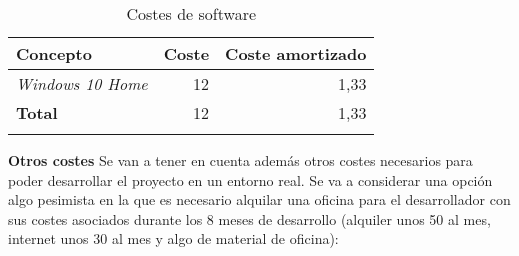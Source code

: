 \begin{longtable}[]{@{}lrr@{}}
	\toprule
	\begin{minipage}[b]{0.29\columnwidth}\raggedright\strut
		\textbf{Concepto}\strut
	\end{minipage} & \begin{minipage}[b]{0.18\columnwidth}\raggedright\strut
		\textbf{Coste}\strut
	\end{minipage} & \begin{minipage}[b]{0.32\columnwidth}\raggedright\strut
		\textbf{Coste amortizado}\strut
	\end{minipage}\tabularnewline
	\midrule
	\endhead
	\begin{minipage}[t]{0.29\columnwidth}\raggedright\strut
		\textit{Windows 10 Home}\strut
	\end{minipage} & \begin{minipage}[t]{0.18\columnwidth}\raggedright\strut
		12 \officialeuro\strut
	\end{minipage} & \begin{minipage}[t]{0.32\columnwidth}\raggedright\strut
		1,33 \officialeuro\strut
	\end{minipage}\tabularnewline
	\midrule
	\begin{minipage}[t]{0.29\columnwidth}\raggedright\strut
		\textbf{Total}\strut
	\end{minipage} & \begin{minipage}[t]{0.18\columnwidth}\raggedright\strut
		12 \officialeuro\strut
	\end{minipage} & \begin{minipage}[t]{0.32\columnwidth}\raggedright\strut
		1,33 \officialeuro\strut
	\end{minipage}\tabularnewline
	\bottomrule
	\caption{Costes de software}
\end{longtable}

\textbf{Otros costes}
Se van a tener en cuenta además otros costes necesarios para poder desarrollar el proyecto en un entorno real. Se va a considerar una opción algo pesimista en la que es necesario alquilar una oficina para el desarrollador con sus costes asociados durante los 8 meses de desarrollo (alquiler unos 50 \officialeuro al mes, internet unos 30 \officialeuro al mes y algo de material de oficina):\\

